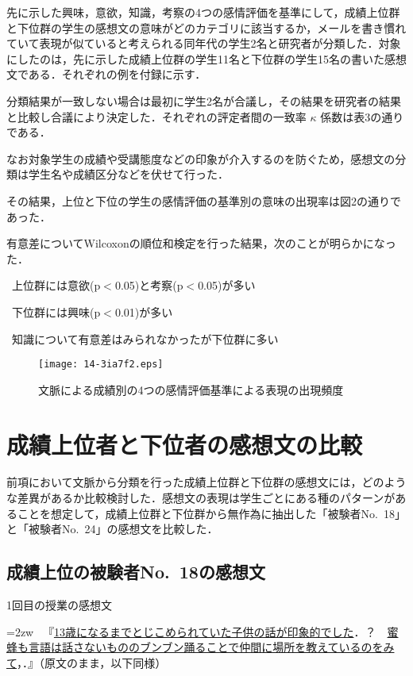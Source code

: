 \documentclass[japanese]{jnlp_1.3a}
\begin{document}
先に示した興味，意欲，知識，考察の4つの感情評価を基準にして，成績上位群と下位群の学生の感想文の意味がどのカテゴリに該当するか，メールを書き慣れていて表現が似ていると考えられる同年代の学生2名と研究者が分類した．対象にしたのは，先に示した成績上位群の学生11名と下位群の学生15名の書いた感想文である．それぞれの例を付録に示す．

分類結果が一致しない場合は最初に学生2名が合議し，その結果を研究者の結果と比較し合議により決定した．それぞれの評定者間の一致率 $\kappa$ 係数は表3の通りである．

\begin{table}[tbp]

\label{table3}
\end{table}

なお対象学生の成績や受講態度などの印象が介入するのを防ぐため，感想文の分類は学生名や成績区分などを伏せて行った．

その結果，上位と下位の学生の感情評価の基準別の意味の出現率は図2の通りであった．

有意差についてWilcoxonの順位和検定を行った結果，次のことが明らかになった．

\textbullet~上位群には意欲(p$<$0.05)と考察(p$<$0.05)が多い

\textbullet~下位群には興味(p$<$0.01)が多い

\textbullet~知識について有意差はみられなかったが下位群に多い

\begin{figure}[tbp]
\centerline{\texttt{[image: 14-3ia7f2.eps]}}
\caption{文脈による成績別の4つの感情評価基準による表現の出現頻度}
\label{fig2}
\end{figure}

\section{成績上位者と下位者の感想文の比較}

前項において文脈から分類を行った成績上位群と下位群の感想文には，どのような差異があるか比較検討した．感想文の表現は学生ごとにある種のパターンがあることを想定して，成績上位群と下位群から無作為に抽出した「被験者No.~18」と「被験者No.~24」の感想文を比較した．

\subsection{成績上位の被験者No.~18の感想文}

1回目の授業の感想文

\hangindent=2zw
\textbullet~『\ul{13歳になるまでとじこめられていた子供の話が印象的でした}．？　\ul{蜜蜂も言語は話さないもののブンブン踊ることで仲間に場所を教えているのをみて}，．』（原文のまま，以下同様）
\end{document}
